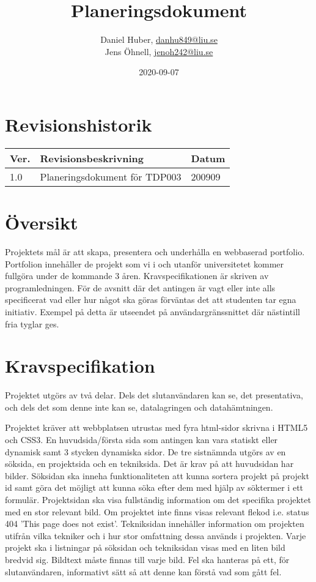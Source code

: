 \documentclass{TDP003mall}
\author{Daniel Huber, \url{danhu849@liu.se}\\
  Jens Öhnell, \url{jenoh242@liu.se}}
\title{Planeringsdokument}
\date{2020-09-07}
\begin{document}
\projectpage
\section{Revisionshistorik}
\begin{table}[!h]
\begin{tabularx}{\linewidth}{|l|X|l|}
\hline
Ver. & Revisionsbeskrivning & Datum \\\hline
1.0 & Planeringsdokument för TDP003 & 200909 \\\hline
\end{tabularx}
\end{table}


\section{Översikt}
Projektets mål är att skapa, presentera och underhålla en webbaserad portfolio. Portfolion innehåller de projekt som vi i och utanför universitetet kommer fullgöra under de kommande 3 åren. Kravspecifikationen är skriven av programledningen. För de avsnitt där det antingen är vagt eller inte alls specificerat vad eller hur något ska göras förväntas det att studenten tar egna initiativ. Exempel på detta är utseendet på användargränssnittet där nästintill fria tyglar ges.


\section{Kravspecifikation}
Projektet utgörs av två delar. Dels det slutanvändaren kan se, det presentativa, och dels det som denne inte kan se, datalagringen och datahämtningen.

Projektet kräver att webbplatsen utrustas med fyra html-sidor skrivna i HTML5 och CSS3. En huvudsida/första sida som antingen kan vara statiskt eller dynamisk samt 3 stycken dynamiska sidor. De tre sistnämnda utgörs av en söksida, en projektsida och en tekniksida. Det är krav på att huvudsidan har bilder. Söksidan ska inneha funktionaliteten att kunna sortera projekt på projekt id samt göra det möjligt att kunna söka efter dem med hjälp av söktermer i ett formulär. Projektsidan ska visa fullständig information om det specifika projektet med en stor relevant bild. Om projektet inte finns visas relevant flekod i.e. status 404 'This page does not exist'. Tekniksidan innehåller information om projekten utifrån vilka tekniker och i hur stor omfattning dessa används i projekten. Varje projekt ska i listningar på söksidan och tekniksidan visas med en liten bild bredvid sig. Bildtext måste finnas till varje bild. Fel ska hanteras på ett, för slutanvändaren, informativt sätt så att denne kan förstå vad som gått fel.
\end{document}
